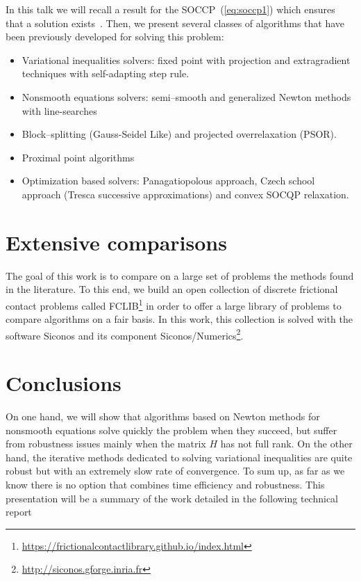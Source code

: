 \documentclass[11pt,a4paper]{article}
\begin{document}
In this talk we will recall a result for the SOCCP~(\ref{eq:soccp1}) which ensures that a solution exists~\cite{Acary.ea_ZAMM2011}. Then, we present several classes of algorithms that have been previously developed for solving this problem:
\begin{itemize}
  \setlength\itemsep{0em}
\item Variational inequalities solvers: fixed point with projection and extragradient techniques with self-adapting step rule.
\item Nonsmooth equations solvers: semi--smooth and generalized Newton methods with line-searches
\item Block--splitting (Gauss-Seidel Like) and projected overrelaxation (PSOR).
\item Proximal point algorithms
\item Optimization based solvers: Panagatiopolous approach, Czech school approach (Tresca successive approximations) and convex SOCQP relaxation.
\end{itemize}
\vspace{-0.6cm}\section{Extensive comparisons}
The goal of this work is to compare on a large set of problems the methods found in the literature. To this end, we build an open collection of discrete frictional contact problems called FCLIB\footnote{\href{https://frictionalcontactlibrary.github.io/index.html}{https://frictionalcontactlibrary.github.io/index.html}} in order to offer a large library of problems to compare algorithms on a fair basis.  In this work, this collection is solved with the software {\sc Siconos} and its component {\sc Siconos/Numerics}\footnote{\href{http://siconos.gforge.inria.fr}{http://siconos.gforge.inria.fr}}.


\vspace{-0.5cm}\section{Conclusions}

On one hand, we will show that algorithms based on Newton methods for nonsmooth equations solve quickly the problem when they succeed, but suffer from robustness issues mainly when the matrix $H$ has not full rank. On the other hand, the 
iterative methods dedicated to solving variational inequalities are quite robust but with an extremely slow rate of convergence. To sum up, as far as we know there is no option that combines time efficiency and robustness. This presentation will be a summary of the work detailed in the following technical report~\cite{acary:hal-01630836}
\end{document}
